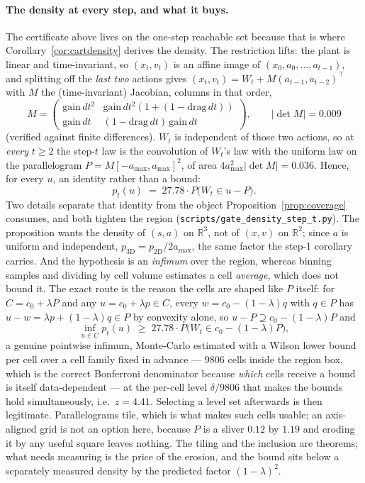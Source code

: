\documentclass[11pt]{article}
\theoremstyle{definition}
\theoremstyle{remark}
\begin{document}
\paragraph{The density at every step, and what it buys.} The certificate above lives on the one-step reachable set because that is where Corollary~\ref{cor:cartdensity} derives the density. The restriction lifts: the plant is linear and time-invariant, so $(x_t, v_t)$ is an affine image of $(x_0, a_0, \dots, a_{t-1})$, and splitting off the \emph{last two} actions gives $(x_t,v_t) = W_t + M(a_{t-1}, a_{t-2})^{\!\top}$ with $M$ the (time-invariant) Jacobian, columns in that order,
\[
  M = \begin{pmatrix} \mathrm{gain}\,dt^2 & \mathrm{gain}\,dt^2(1 + (1-\mathrm{drag}\,dt)) \\ \mathrm{gain}\,dt & (1-\mathrm{drag}\,dt)\,\mathrm{gain}\,dt \end{pmatrix}, \qquad |\det M| = 0.009
\]
(verified against finite differences). $W_t$ is independent of those two actions, so at \emph{every} $t \geq 2$ the step-$t$ law is the convolution of $W_t$'s law with the uniform law on the parallelogram $P = M[-a_{\max},a_{\max}]^2$, of area $4a_{\max}^2|\det M| = 0.036$. Hence, for every $u$, an identity rather than a bound:
\[
  p_t(u) \;=\; 27.78 \cdot P\big(W_t \in u - P\big) .
\]
Two details separate that identity from the object Proposition~\ref{prop:coverage} consumes, and both tighten the region (\texttt{scripts/\allowbreak gate\_\allowbreak density\_\allowbreak step\_\allowbreak t.py}). The proposition wants the density of $(s,a)$ on $\mathbb{R}^{3}$, not of $(x,v)$ on $\mathbb{R}^{2}$; since $a$ is uniform and independent, $p_{3\mathrm{D}} = p_{2\mathrm{D}}/2a_{\max}$, the same factor the step-1 corollary carries. And the hypothesis is an \emph{infimum} over the region, whereas binning samples and dividing by cell volume estimates a cell \emph{average}, which does not bound it. The exact route is the reason the cells are shaped like $P$ itself: for $C = c_0 + \lambda P$ and any $u = c_0 + \lambda p \in C$, every $w = c_0 - (1-\lambda)q$ with $q \in P$ has $u - w = \lambda p + (1-\lambda) q \in P$ by convexity alone, so $u - P \supseteq c_0 - (1-\lambda)P$ and
\[
  \inf_{u \in C} p_t(u) \;\geq\; 27.78 \cdot P\big(W_t \in c_0 - (1-\lambda)P\big),
\]
a genuine pointwise infimum, Monte-Carlo estimated with a Wilson lower bound per cell over a cell family fixed in advance --- $9806$ cells inside the region box, which is the correct Bonferroni denominator because \emph{which} cells receive a bound is itself data-dependent --- at the per-cell level $\delta/9806$ that makes the bounds hold simultaneously, i.e.\ $z = 4.41$. Selecting a level set afterwards is then legitimate. Parallelograms tile, which is what makes such cells usable; an axis-aligned grid is not an option here, because $P$ is a sliver $0.12$ by $1.19$ and eroding it by any useful square leaves nothing. The tiling and the inclusion are theorems; what needs measuring is the price of the erosion, and the bound sits below a separately measured density by the predicted factor $(1-\lambda)^2$.
\end{document}
